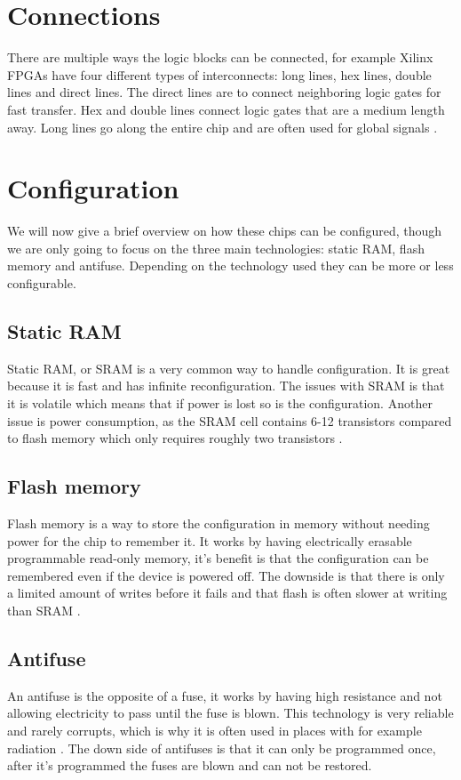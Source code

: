 \section{Connections}
There are multiple ways the logic blocks can be connected, for example Xilinx
FPGAs have four different types of interconnects: long lines, hex lines, double
lines and direct lines. The direct lines are to connect neighboring logic gates
for fast transfer. Hex and double lines connect logic gates that are a medium
length away. Long lines go along the entire chip and are often used for global
signals \citep{HideharuAmano8}.


\section{Configuration}
We will now give a brief overview on how these chips can be configured, though
we are only going to focus on the three main technologies: static RAM, flash
memory and antifuse. Depending on the technology used they can be more or less
configurable.

\subsection{Static RAM}
Static RAM, or SRAM is a very common way to handle configuration. It is great
because it is fast and has infinite reconfiguration. The issues with SRAM is
that it is volatile which means that if power is lost so is the configuration.
Another issue is power consumption, as the SRAM cell contains 6-12 transistors
compared to flash memory which only requires roughly two transistors
\citep{HideharuAmano8}.

\subsection{Flash memory}
Flash memory is a way to store the configuration in memory without needing
power for the chip to remember it. It works by having electrically erasable
programmable read-only memory, it's benefit is that the configuration can be
remembered even if the device is powered off. The downside is that there is only
a limited amount of writes before it fails and that flash is often slower at
writing than SRAM \citep{M.MorrisMano3}.

\subsection{Antifuse}
An antifuse is the opposite of a fuse, it works by having high resistance and
not allowing electricity to pass until the fuse is blown. This technology is
very reliable and rarely corrupts, which is why it is often used in places with
for example radiation \citep[Ch. 1]{ScottHauckAndreDeHon5}. The down side of antifuses is that it can only be
programmed once, after it's programmed the fuses are blown and can not be
restored.
